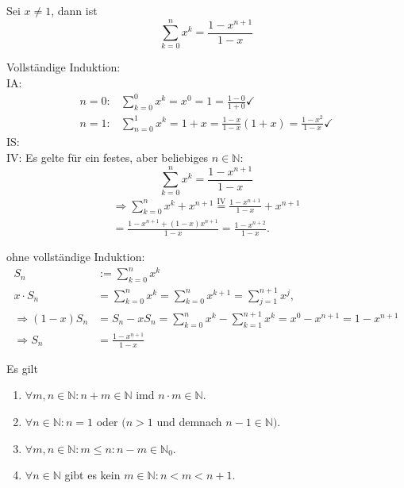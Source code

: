\documentclass[../ana1.tex]{subfiles}
\begin{document}
\begin{satz}
	Sei $x\neq 1$, dann ist $$\sum_{k=0}^{n}x^k = \frac{1-x^{n+1}}{1-x}$$
\end{satz}
\begin{bew}
	Vollständige Induktion:\\
	IA:
	\begin{equation*}
		\begin{aligned}
			n=0: & \sum_{k=0}^{0} x^k = x^0 = 1 = \frac{1-0}{1+0}\checkmark                       \\
			n=1: & \sum_{n=0}^{1} x^k = 1+x = \frac{1-x}{1-x} (1+x) = \frac{1-x^2}{1-x}\checkmark
		\end{aligned}
	\end{equation*}
	IS:\\
	IV: Es gelte für ein festes, aber beliebiges $n\in\mathbb{N}$: $$\sum_{k=0}^{n} x^k = \frac{1-x^{n+1}}{1-x}$$
	\begin{equation}
		\begin{aligned}
			\Rightarrow \sum_{k=0}^{n} x^k + x^{n+1} \overset{\text{IV}}{=} \frac{1-x^{n+1}}{1-x} + x^{n+1} \\
			= \frac{1-x^{n+1} + (1-x)x^{n+1}}{1-x} = \frac{1-x^{n+2}}{1-x}.
		\end{aligned}
	\end{equation}
\end{bew}
\begin{bew} ohne vollständige Induktion:
	\[
		\begin{aligned}
			S_n                  & := \sum_{k=0}^{n} x^k                                                                 \\
			x\cdot S_n           & = \sum_{k=0}^{n} x^k = \sum_{k=0}^{n} x^{k+1} = \sum_{j=1}^{n+1} x^j,                 \\
			\Rightarrow (1-x)S_n & = S_n - x S_n = \sum_{k=0}^{n} x^k - \sum_{k=1}^{n+1} x^k = x^0 - x^{n+1} = 1-x^{n+1} \\
			\Rightarrow S_n      & = \frac{1-x^{n+1}}{1-x}
		\end{aligned}\]
\end{bew}
\begin{satz}
	Es gilt
	\begin{enumerate}
		\item $\forall m,n \in \mathbb{N}: n+m \in \mathbb{N}$ imd $n\cdot m \in \mathbb{N}$.
		\item $\forall n\in\mathbb{N}: n=1$ oder $(n>1$ und demnach $n-1 \in \mathbb{N})$.
		\item $\forall m,n\in\mathbb{N}:m\leq n:n-m\in\mathbb{N}_0$.
		\item $\forall n\in\mathbb{N}$ gibt es kein $m\in\mathbb{N}: n<m<n+1$.
	\end{enumerate}
\end{satz}
\end{document}
